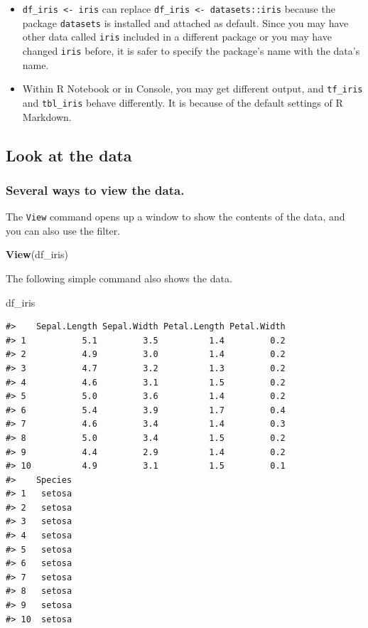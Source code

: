 \documentclass[
  xelatex, ja=standard]{bxjsbook}
\newenvironment{Shaded}{\begin{snugshade}}{\end{snugshade}}
\newcommand{\FunctionTok}[1]{\textcolor[rgb]{0.13,0.29,0.53}{\textbf{#1}}}
\newcommand{\NormalTok}[1]{#1}
\providecommand{\tightlist}{%
  \setlength{\itemsep}{0pt}\setlength{\parskip}{0pt}}
\theoremstyle{definition}
\theoremstyle{definition}
\theoremstyle{definition}
\theoremstyle{definition}
\theoremstyle{remark}
\begin{document}
\begin{itemize}
\tightlist
\item
  \texttt{df\_iris\ \textless{}-\ iris} can replace \texttt{df\_iris\ \textless{}-\ datasets::iris} because the package \texttt{datasets} is installed and attached as default. Since you may have other data called \texttt{iris} included in a different package or you may have changed \texttt{iris} before, it is safer to specify the package's name with the data's name.
\item
  Within R Notebook or in Console, you may get different output, and \texttt{tf\_iris} and \texttt{tbl\_iris} behave differently. It is because of the default settings of R Markdown.
\end{itemize}

\hypertarget{look-at-the-data}{%
\subsection{Look at the data}\label{look-at-the-data}}

\hypertarget{several-ways-to-view-the-data.}{%
\subsubsection{Several ways to view the data.}\label{several-ways-to-view-the-data.}}

The \texttt{View} command opens up a window to show the contents of the data, and you can also use the filter.

\begin{Shaded}
\begin{Highlighting}[]
\FunctionTok{View}\NormalTok{(df\_iris)}
\end{Highlighting}
\end{Shaded}

The following simple command also shows the data.

\begin{Shaded}
\begin{Highlighting}[]
\NormalTok{df\_iris}
\end{Highlighting}
\end{Shaded}

\begin{verbatim}
#>    Sepal.Length Sepal.Width Petal.Length Petal.Width
#> 1           5.1         3.5          1.4         0.2
#> 2           4.9         3.0          1.4         0.2
#> 3           4.7         3.2          1.3         0.2
#> 4           4.6         3.1          1.5         0.2
#> 5           5.0         3.6          1.4         0.2
#> 6           5.4         3.9          1.7         0.4
#> 7           4.6         3.4          1.4         0.3
#> 8           5.0         3.4          1.5         0.2
#> 9           4.4         2.9          1.4         0.2
#> 10          4.9         3.1          1.5         0.1
#>    Species
#> 1   setosa
#> 2   setosa
#> 3   setosa
#> 4   setosa
#> 5   setosa
#> 6   setosa
#> 7   setosa
#> 8   setosa
#> 9   setosa
#> 10  setosa
\end{verbatim}
\end{document}

